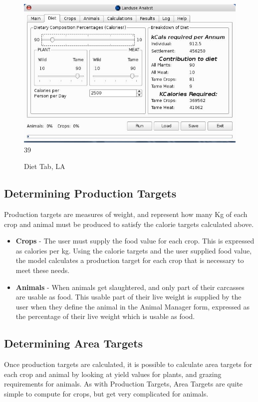 \begin{figure}[htbp]
    \includegraphics[scale=.355]{./images/LanduseAnalystDiet545.jpg}
39
  \caption{\label{fig:LADiet}Diet Tab, LA}
\end{figure}

\subsection{Determining Production Targets}
  Production targets are measures of weight, and represent how many Kg of each
  crop and animal must be produced to satisfy the calorie targets calculated
  above.
\begin{itemize}
 \item \textbf{Crops} - The user must supply the food value for each crop.  This is expressed as
calories per kg.  Using the calorie targets and the user supplied food value,
the model calculates a production target for each crop that is necessary to
meet these needs.
 \item \textbf{Animals} - When animals get slaughtered, and only part of their carcasses are usable as
food.  This usable part of their live weight is supplied by the user when they
define the animal in the Animal Manager form, expressed as the percentage of
their live weight which is usable as food.
\end{itemize}

\subsection{Determining Area Targets}
Once production targets are calculated, it is possible to calculate area
targets for each crop and animal by looking at yield values for plants, and
grazing requirements for animals.  As with Production Targets, Area Targets are
quite simple to compute for crops, but get very complicated for animals.

